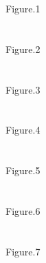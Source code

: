 \newpage
Figure.1\\
\\
\\
Figure.2\\
\\
\\
Figure.3\\
\\
\\
Figure.4\\
\\
\\
Figure.5\\
\\
\\
Figure.6\\
\\
\\
Figure.7\\




